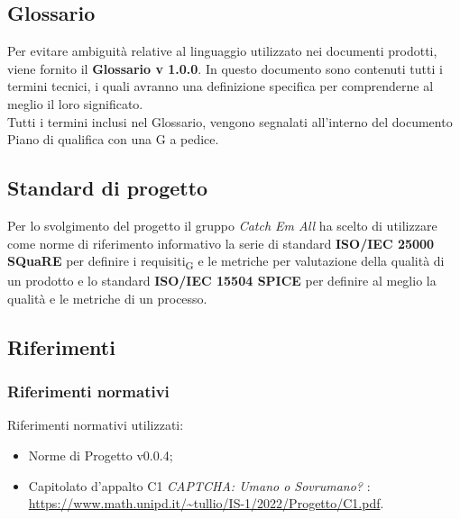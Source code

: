 \subsection{Glossario}
Per evitare ambiguità relative al linguaggio utilizzato nei documenti prodotti, viene fornito il \textbf{Glossario v 1.0.0}. In questo documento sono contenuti tutti i termini tecnici, i quali avranno una definizione specifica per comprenderne al meglio il loro significato.\\
Tutti i termini inclusi nel Glossario, vengono segnalati all'interno del documento Piano di qualifica con una G a pedice.


\subsection{Standard di progetto}
Per lo svolgimento del progetto il gruppo \textit{Catch Em All} ha scelto di utilizzare come norme di riferimento informativo la serie di standard \textbf{ISO/IEC 25000 SQuaRE} per definire i requisiti\textsubscript{G} e le metriche per valutazione della qualità di un prodotto e lo standard \textbf{ISO/IEC 15504 SPICE} per definire al meglio la qualità e le metriche di un processo.

\subsection{Riferimenti}
\subsubsection{Riferimenti normativi}
Riferimenti normativi utilizzati:
\begin{itemize}
	\item Norme di Progetto v0.0.4;
	\item Capitolato d'appalto C1 \textit{CAPTCHA: Umano o Sovrumano?} : \\
		\url{https://www.math.unipd.it/~tullio/IS-1/2022/Progetto/C1.pdf}.
\end{itemize}
